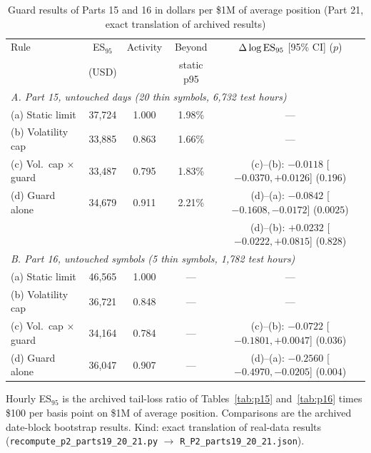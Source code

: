 \documentclass[12pt]{article}
\theoremstyle{definition}
\theoremstyle{remark}
\begin{document}
\begin{table}[!tbp]\centering\footnotesize
\begin{threeparttable}
\caption{Guard results of Parts 15 and 16 in dollars per \$1M of average position (Part 21, exact translation of archived results)}\label{tab:p21}
\setlength{\tabcolsep}{1.8pt}
\begin{tabular}{lcccc}
\toprule
Rule & ES$_{95}$ & Activity & Beyond & $\Delta\log{\rm ES}_{95}$ [95\% CI] ($p$)\\
 & (USD) & & static p95 & \\
\midrule
\multicolumn{5}{l}{\emph{A. Part 15, untouched days (20 thin symbols, 6{,}732 test hours)}}\\
(a) Static limit & 37{,}724 & 1.000 & 1.98\% & ---\\
(b) Volatility cap & 33{,}885 & 0.863 & 1.66\% & ---\\
(c) Vol.\ cap $\times$ guard & 33{,}487 & 0.795 & 1.83\% & (c)--(b): $-0.0118$ [$-0.0370, +0.0126$] ($0.196$)\\
(d) Guard alone & 34{,}679 & 0.911 & 2.21\% & (d)--(a): $-0.0842$ [$-0.1608, -0.0172$] ($0.0025$)\\
 & & & & (d)--(b): $+0.0232$ [$-0.0222, +0.0815$] ($0.828$)\\
\midrule
\multicolumn{5}{l}{\emph{B. Part 16, untouched symbols (5 thin symbols, 1{,}782 test hours)}}\\
(a) Static limit & 46{,}565 & 1.000 & --- & ---\\
(b) Volatility cap & 36{,}721 & 0.848 & --- & ---\\
(c) Vol.\ cap $\times$ guard & 34{,}164 & 0.784 & --- & (c)--(b): $-0.0722$ [$-0.1801, +0.0047$] ($0.036$)\\
(d) Guard alone & 36{,}047 & 0.907 & --- & (d)--(a): $-0.2560$ [$-0.4970, -0.0205$] ($0.004$)\\
\bottomrule
\end{tabular}
\begin{tablenotes}\footnotesize\item Hourly ES$_{95}$ is the archived tail-loss ratio of Tables~\ref{tab:p15} and~\ref{tab:p16} times \$100 per basis point on \$1M of average position. Comparisons are the archived date-block bootstrap results. Kind: exact translation of real-data results (\texttt{recompute\_p2\_parts19\_20\_21.py} $\to$ \texttt{R\_P2\_parts19\_20\_21.json}).\end{tablenotes}
\end{threeparttable}
\end{table}
\end{document}
